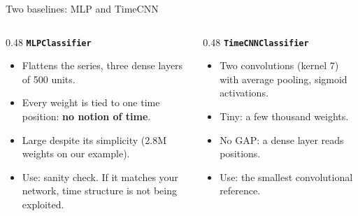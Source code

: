 \documentclass[aspectratio=169,10pt]{beamer}
\begin{document}
\begin{frame}{Two baselines: MLP and TimeCNN}
  \begin{columns}[t]
    \begin{column}{0.48\textwidth}
      \textbf{\texttt{MLPClassifier}}
      \begin{itemize}
        \item Flattens the series, three dense layers of 500 units.
        \item Every weight is tied to one time position: \textbf{no notion of time}.
        \item Large despite its simplicity (2.8M weights on our example).
        \item Use: sanity check. If it matches your network, time structure is not being exploited.
      \end{itemize}
    \end{column}
    \begin{column}{0.48\textwidth}
      \textbf{\texttt{TimeCNNClassifier}}
      \begin{itemize}
        \item Two convolutions (kernel 7) with average pooling, sigmoid activations.
        \item Tiny: a few thousand weights.
        \item No GAP: a dense layer reads positions.
        \item Use: the smallest convolutional reference.
      \end{itemize}
    \end{column}
  \end{columns}
  \vfill
\end{frame}
\end{document}
